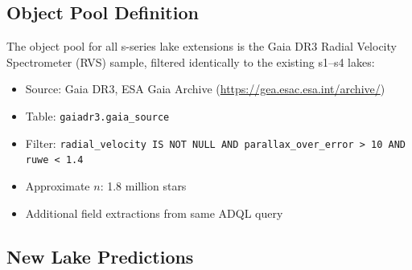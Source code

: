\documentclass[12pt,a4paper]{article}
\begin{document}
\subsection{Object Pool Definition}

The object pool for all s-series lake extensions is the Gaia DR3 Radial
Velocity Spectrometer (RVS) sample, filtered identically to the existing s1--s4
lakes:
\begin{itemize}
  \item Source: Gaia DR3, ESA Gaia Archive (\url{https://gea.esac.esa.int/archive/})
  \item Table: \texttt{gaiadr3.gaia\_source}
  \item Filter: \texttt{radial\_velocity IS NOT NULL AND parallax\_over\_error > 10
        AND ruwe < 1.4}
  \item Approximate $n$: 1.8 million stars
  \item Additional field extractions from same ADQL query
\end{itemize}

\subsection{New Lake Predictions}
\end{document}
